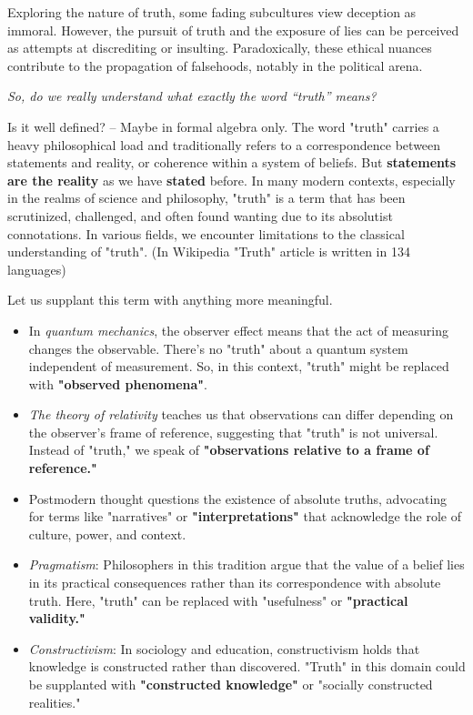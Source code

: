 \documentclass[11pt,a4]{article}
\begin{document}
Exploring the nature of truth, some fading subcultures view deception as immoral. However, the pursuit of truth and the exposure of lies can be perceived as attempts at discrediting or insulting. Paradoxically, these ethical nuances contribute to the propagation of falsehoods, notably in the political arena.\\
\par
\textit{So, do we really understand what exactly the word “truth” means?} \\
\par
Is it well defined? -- Maybe in formal algebra only. The word "truth" carries a heavy philosophical load and traditionally refers to a correspondence between statements and reality, or coherence within a system of beliefs. But \textbf{statements are the reality} as we have \textbf{stated} before.
In many modern contexts, especially in the realms of science and philosophy, "truth" is a term that has been scrutinized, challenged, and often found wanting due to its absolutist connotations.
In various fields, we encounter limitations to the classical understanding of "truth".
(In Wikipedia "Truth" article is written in 134 languages)

Let us supplant this term with anything more meaningful.

\begin{itemize}

    \item In \textit{quantum mechanics}, the observer effect means that the act of measuring changes the observable. There's no "truth" about a quantum system independent of measurement. So, in this context, "truth" might be replaced with \textbf{"observed phenomena"}.
    \item \textit{The theory of relativity} teaches us that observations can differ depending on the observer's frame of reference, suggesting that "truth" is not universal. Instead of "truth," we speak of \textbf{"observations relative to a frame of reference."}
    \item Postmodern thought questions the existence of absolute truths, advocating for terms like "narratives" or \textbf{"interpretations"} that acknowledge the role of culture, power, and context.
    \item \textit{Pragmatism}: Philosophers in this tradition argue that the value of a belief lies in its practical consequences rather than its correspondence with absolute truth. Here, "truth" can be replaced with "usefulness" or \textbf{"practical validity."}
    \item \textit{Constructivism}: In sociology and education, constructivism holds that knowledge is constructed rather than discovered. "Truth" in this domain could be supplanted with \textbf{"constructed knowledge"} or "socially constructed realities."
\end{itemize}
\end{document}
